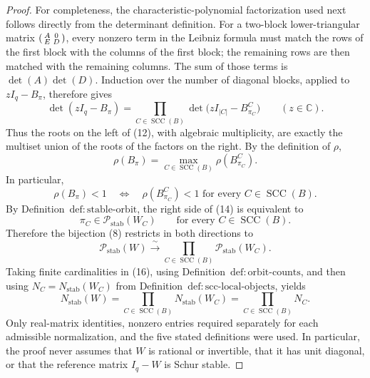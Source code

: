 \documentclass{article}
\begin{document}
\begin{proof}
For completeness, the characteristic-polynomial factorization used next follows directly from the determinant definition.  For a two-block lower-triangular matrix
\(
 \begin{psmallmatrix}A&0\\ E&D\end{psmallmatrix}
\), every nonzero term in the Leibniz formula must match the rows of the first block with the columns of the first block; the remaining rows are then matched with the remaining columns.  The sum of those terms is \(\det(A)\det(D)\).  Induction over the number of diagonal blocks, applied to \(zI_q-B_\pi\), therefore gives
\[
 \det(zI_q-B_\pi)
 =\prod_{C\in\operatorname{SCC}(B)}
 \det\bigl(zI_{|C|}-B^C_{\pi_C}\bigr)
 \qquad(z\in\mathbb C). \tag{12}
\]
Thus the roots on the left of (12), with algebraic multiplicity, are exactly the multiset union of the roots of the factors on the right.  By the definition of \(\rho\),
\[
 \rho(B_\pi)
 =\max_{C\in\operatorname{SCC}(B)}
 \rho(B^C_{\pi_C}). \tag{13}
\]
In particular,
\[
 \rho(B_\pi)<1
 \quad\Longleftrightarrow\quad
 \rho(B^C_{\pi_C})<1
 \text{ for every }C\in\operatorname{SCC}(B). \tag{14}
\]
By Definition~\(\mathrm{def:stable\text{-}orbit}\), the right side of (14) is equivalent to
\[
 \pi_C\in\mathcal P_{\mathrm{stab}}(W_C)
 \qquad\text{for every }C\in\operatorname{SCC}(B). \tag{15}
\]
Therefore the bijection (8) restricts in both directions to
\[
 \mathcal P_{\mathrm{stab}}(W)
 \xrightarrow{\ \sim\ }
 \prod_{C\in\operatorname{SCC}(B)}
 \mathcal P_{\mathrm{stab}}(W_C). \tag{16}
\]
Taking finite cardinalities in (16), using Definition~\(\mathrm{def:orbit\text{-}counts}\), and then using \(N_C=N_{\mathrm{stab}}(W_C)\) from Definition~\(\mathrm{def:scc\text{-}local\text{-}objects}\), yields
\[
 N_{\mathrm{stab}}(W)
 =\prod_{C\in\operatorname{SCC}(B)}N_{\mathrm{stab}}(W_C)
 =\prod_{C\in\operatorname{SCC}(B)}N_C. \tag{17}
\]
Only real-matrix identities, nonzero entries required separately for each admissible normalization, and the five stated definitions were used.  In particular, the proof never assumes that \(W\) is rational or invertible, that it has unit diagonal, or that the reference matrix \(I_q-W\) is Schur stable.
\end{proof}
\end{document}
